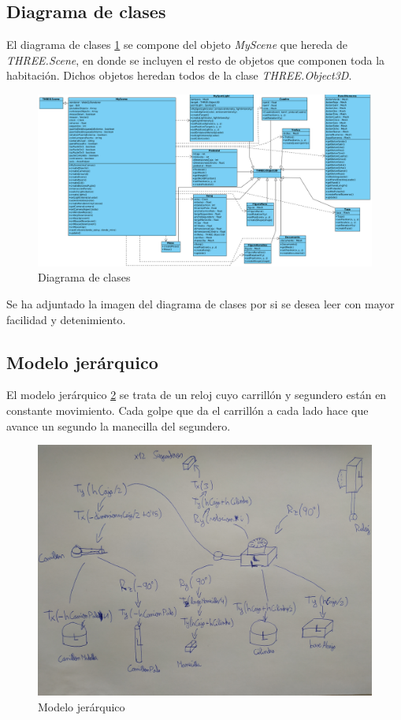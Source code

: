 \subsection{Diagrama de clases}

El diagrama de clases \ref{fig:diagrama} se compone del objeto \textit{MyScene} que hereda de \textit{THREE.Scene}, en donde se incluyen el resto de objetos que componen toda la habitación. Dichos objetos heredan todos de la clase \textit{THREE.Object3D}.

\begin{figure}[H]
  \centering
  \includegraphics[scale=0.3]{diagrama}
  \caption{Diagrama de clases}
  \label{fig:diagrama}
\end{figure}

Se ha adjuntado la imagen del diagrama de clases por si se desea leer con mayor facilidad y detenimiento.

\newpage

\subsection{Modelo jerárquico}
El modelo jerárquico \ref{fig:jerarquico} se trata de un reloj cuyo carrillón y segundero están en constante movimiento. Cada golpe que da el carrillón a cada lado hace que avance un segundo la manecilla del segundero.

\begin{figure}[H]
  \centering
  \includegraphics[scale=0.09]{modelo-jerarquico}
  \caption{Modelo jerárquico}
  \label{fig:jerarquico}
\end{figure}

